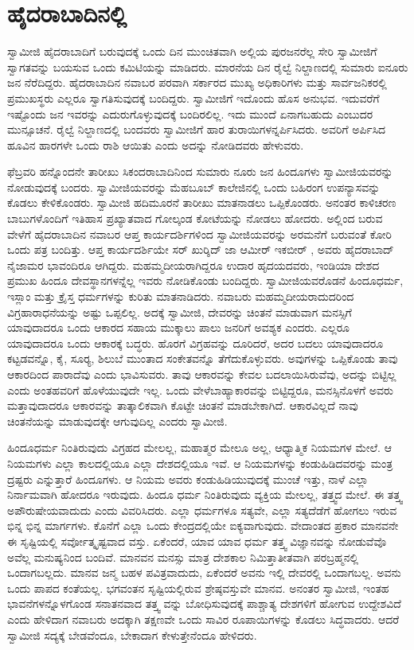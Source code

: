 
\chapter{ಹೈದರಾಬಾದಿನಲ್ಲಿ}

 ಸ್ವಾಮೀಜಿ ಹೈದರಾಬಾದಿಗೆ ಬರುವುದಕ್ಕೆ ಒಂದು ದಿನ ಮುಂಚಿತವಾಗಿ ಅಲ್ಲಿಯ ಪುರಜನರೆಲ್ಲ ಸೇರಿ ಸ್ವಾಮೀಜಿಗೆ ಸ್ವಾಗತವನ್ನು ಬಯಸುವ ಒಂದು ಕಮಿಟಿಯನ್ನು ಮಾಡಿದರು. ಮಾರನೆಯ ದಿನ ರೈಲ್ವೆ ನಿಲ್ದಾಣದಲ್ಲಿ ಸುಮಾರು ಐನೂರು ಜನ ನೆರೆದಿದ್ದರು. ಹೈದರಾಬಾದಿನ ನವಾಬರ ಪರವಾಗಿ ಸರ್ಕಾರದ ಮುಖ್ಯ ಅಧಿಕಾರಿಗಳು ಮತ್ತು ಸಾರ್ವಜನಿಕರಲ್ಲಿ ಪ್ರಮುಖಸ್ಥರು ಎಲ್ಲರೂ ಸ್ವಾಗತಿಸುವುದಕ್ಕೆ ಬಂದಿದ್ದರು. ಸ್ವಾಮೀಜಿಗೆ ಇದೊಂದು ಹೊಸ ಅನುಭವ. ಇದುವರೆಗೆ ಇಷ್ಟೊಂದು ಜನ ಇವರನ್ನು ಎದುರುಗೊಳ್ಳುವುದಕ್ಕೆ ಬಂದಿರಲಿಲ್ಲ. ಇದು ಮುಂದೆ ಏನಾಗಬಹುದು ಎಂಬುದರ ಮುನ್ಸೂಚನೆ. ರೈಲ್ವೆ ನಿಲ್ದಾಣದಲ್ಲಿ ಬಂದವರು ಸ್ವಾಮೀಜಿಗೆ ಹಾರ ತುರಾಯಿಗಳನ್ನರ್ಪಿಸಿದರು. ಅವರಿಗೆ ಅರ್ಪಿಸಿದ ಹೂವಿನ ಹಾರಗಳೇ ಒಂದು ರಾಶಿ ಆಯಿತು ಎಂದು ಅದನ್ನು ನೋಡಿದವರು ಹೇಳುವರು. 

 ಫೆಬ್ರವರಿ ಹನ್ನೊಂದನೇ ತಾರೀಖು ಸಿಕಂದರಾಬಾದಿನಿಂದ ಸುಮಾರು ನೂರು ಜನ ಹಿಂದೂಗಳು ಸ್ವಾಮೀಜಿಯವರನ್ನು ನೋಡುವುದಕ್ಕೆ ಬಂದರು. ಸ್ವಾಮೀಜಿಯವರನ್ನು ಮೆಹಬೂಬ್ ಕಾಲೇಜಿನಲ್ಲಿ ಒಂದು ಬಹಿರಂಗ ಉಪನ್ಯಾಸವನ್ನು ಕೊಡಲು ಕೇಳಿಕೊಂಡರು. ಸ್ವಾಮೀಜಿ ಹದಿಮೂರನೆ ತಾರೀಖು ಮಾತನಾಡಲು ಒಪ್ಪಿಕೊಂಡರು. ಅನಂತರ ಕಾಳಿಚರಣ ಬಾಬುಗಳೊಂದಿಗೆ ಇತಿಹಾಸ ಪ್ರಖ್ಯಾತವಾದ ಗೋಲ್ಕಂಡ ಕೋಟೆಯನ್ನು ನೋಡಲು ಹೋದರು. ಅಲ್ಲಿಂದ ಬರುವ ವೇಳೆಗೆ ಹೈದರಾಬಾದಿನ ನವಾಬರ ಆಪ್ತ ಕಾರ್ಯದರ್ಶಿಗಳಿಂದ ಸ್ವಾಮೀಜಿಯವರನ್ನು ಅರಮನೆಗೆ ಬರುವಂತೆ ಕೋರಿ ಒಂದು ಪತ್ರ ಬಂದಿತ್ತು. ಆಪ್ತ ಕಾರ್ಯದರ್ಶಿಯೇ ಸರ್ ಖುರ್‍ಶಿದ್ ಜಾ ಆಮೀರ್ ಇಕಬೀರ್ , ಅವರು ಹೈದರಾಬಾದ್ ನೈಜಾಮರ ಭಾವಂದಿರೂ ಆಗಿದ್ದರು. ಮಹಮ್ಮದೀಯರಾಗಿದ್ದರೂ ಉದಾರ ಹೃದಯದವರು, ಇಂಡಿಯಾ ದೇಶದ ಪ್ರಮುಖ ಹಿಂದೂ ದೇವಸ್ಥಾನಗಳನ್ನೆಲ್ಲ ಇವರು ನೋಡಿಕೊಂಡು ಬಂದಿದ್ದರು. ಸ್ವಾಮೀಜಿಯವರೊಡನೆ ಹಿಂದೂಧರ್ಮ, ಇಸ್ಲಾಂ ಮತ್ತು ಕ್ರೈಸ್ತ ಧರ್ಮಗಳನ್ನು ಕುರಿತು ಮಾತನಾಡಿದರು. ನವಾಬರು ಮಹಮ್ಮದೀಯರಾದುದರಿಂದ ವಿಗ್ರಹಾರಾಧನೆಯನ್ನು ಅಷ್ಟು ಒಪ್ಪಲಿಲ್ಲ. ಅದಕ್ಕೆ ಸ್ವಾಮೀಜಿ, ದೇವರನ್ನು ಚಿಂತನೆ ಮಾಡುವಾಗ ಮನಸ್ಸಿಗೆ ಯಾವುದಾದರೂ ಒಂದು ಆಕಾರದ ಸಹಾಯ ಮುಕ್ಕಾಲು ಪಾಲು ಜನರಿಗೆ ಅವಶ್ಯಕ ಎಂದರು. ಎಲ್ಲರೂ ಯಾವುದಾದರೂ ಒಂದು ಆಕಾರಕ್ಕೆ ಬದ್ಧರು. ಹೊರಗೆ ವಿಗ್ರಹವನ್ನು ದೂರಿದರೆ, ಅದರ ಬದಲು ಯಾವುದಾದರೂ ಕಟ್ಟಡವನ್ನೊ, ಕೈ, ಸೂರ‍್ಯ, ಶಿಲುಬೆ ಮುಂತಾದ ಸಂಕೇತವನ್ನೊ ತೆಗೆದುಕೊಳ್ಳುವರು. ಅವುಗಳನ್ನು ಒಪ್ಪಿಕೊಂಡು ತಾವು ಆಕಾರದಿಂದ ಪಾರಾದೆವು ಎಂದು ಭಾವಿಸುವರು. ತಾವು ಆಕಾರವನ್ನು ಕೇವಲ ಬದಲಾಯಿಸಿರುವೆವು, ಅದನ್ನು ಬಿಟ್ಟಿಲ್ಲ ಎಂದು ಅಂತಹವರಿಗೆ ಹೊಳೆಯುವುದೇ ಇಲ್ಲ. ಒಂದು ವೇಳೆ\break ಬಾಹ್ಯಾಕಾರವನ್ನು ಬಿಟ್ಟಿದ್ದರೂ, ಮನಸ್ಸಿನೊಳಗೆ ಅವರು ಮತ್ತಾವುದಾದರೂ ಆಕಾರವನ್ನು ತಾತ್ಕಾಲಿಕವಾಗಿ ಕೊಟ್ಟೇ ಚಿಂತನೆ ಮಾಡಬೇಕಾಗಿದೆ. ಆಕಾರವಿಲ್ಲದೆ ನಾವು ಚಿಂತನೆಯನ್ನು ಮಾಡುವುದಕ್ಕೇ ಆಗುವುದಿಲ್ಲ ಎಂದರು ಸ್ವಾಮೀಜಿ.

 ಹಿಂದೂಧರ್ಮ ನಿಂತಿರುವುದು ವಿಗ್ರಹದ ಮೇಲಲ್ಲ, ಮಹಾತ್ಮರ ಮೇಲೂ ಅಲ್ಲ, ಆಧ್ಯಾತ್ಮಿಕ ನಿಯಮಗಳ ಮೇಲೆ. ಆ ನಿಯಮಗಳು ಎಲ್ಲಾ ಕಾಲದಲ್ಲಿಯೂ ಎಲ್ಲಾ ದೇಶದಲ್ಲಿಯೂ ಇವೆ. ಆ ನಿಯಮಗಳನ್ನು ಕಂಡುಹಿಡಿದವರನ್ನು ಮಂತ್ರ ದ್ರಷ್ಟರು ಎನ್ನುತ್ತಾರೆ ಹಿಂದೂಗಳು. ಆ ನಿಯಮ ಅವರು ಕಂಡುಹಿಡಿಯುವುದಕ್ಕೆ ಮುಂಚೆ ಇತ್ತು, ನಾಳೆ ಎಲ್ಲಾ ನಿರ್ನಾಮವಾಗಿ ಹೋದರೂ ಇರುವುದು. ಹಿಂದೂ ಧರ್ಮ ನಿಂತಿರುವುದು ವ್ಯಕ್ತಿಯ ಮೇಲಲ್ಲ, ತತ್ತ್ವದ ಮೇಲೆ. ಈ ತತ್ತ್ವ ಅಪೌರುಷೇಯವಾದುದು ಎಂದು ವಿವರಿಸಿದರು. ಎಲ್ಲಾ ಧರ್ಮಗಳೂ ಸತ್ಯವೇ, ಎಲ್ಲಾ ಸತ್ಯದೆಡೆಗೆ ಹೋಗಲು ಇರುವ ಭಿನ್ನ ಭಿನ್ನ ಮಾರ್ಗಗಳು. ಕೊನೆಗೆ ಎಲ್ಲಾ ಒಂದು ಕೇಂದ್ರದಲ್ಲಿಯೇ ಐಕ್ಯವಾಗುವುದು. ವೇದಾಂತದ ಪ್ರಕಾರ ಮಾನವನೇ ಈ ಸೃಷ್ಟಿಯಲ್ಲಿ ಸರ್ವೋತ್ಕೃಷ್ಟವಾದ ವಸ್ತು. ಏಕೆಂದರೆ, ಯಾವ ಯಾವ ಧರ್ಮ ತತ್ತ್ವ ವಿಜ್ಞಾನವನ್ನು ನೋಡುವೆವೊ ಅವೆಲ್ಲ ಮನುಷ್ಯನಿಂದ ಬಂದಿವೆ. ಮಾನವನ ಮನಸ್ಸು ಮಾತ್ರ ದೇಶಕಾಲ ನಿಮಿತ್ತಾತೀತವಾಗಿ ಪರಬ್ರಹ್ಮನಲ್ಲಿ ಒಂದಾಗಬಲ್ಲದು. ಮಾನವ ಜನ್ಮ ಬಹಳ ಪವಿತ್ರವಾದುದು, ಏಕೆಂದರೆ ಅವನು ಇಲ್ಲಿ ದೇವರಲ್ಲಿ ಒಂದಾಗಬಲ್ಲ. ಅವನು ಒಂದು ಪಾಪದ ಕಂತೆಯಲ್ಲ. ಭಗವಂತನ ಸೃಷ್ಟಿಯಲ್ಲಿರುವ ಶ್ರೇಷ್ಠವಸ್ತುವೇ ಮಾನವ. ಅನಂತರ ಸ್ವಾಮೀಜಿ, ಇಂತಹ ಭಾವನೆಗಳನ್ನೊಳಗೊಂಡ ಸನಾತನವಾದ ತತ್ತ್ವ ವನ್ನು ಬೋಧಿಸುವುದಕ್ಕೆ ಪಾಶ್ಚಾತ್ಯ ದೇಶಗಳಿಗೆ ಹೋಗುವ ಉದ್ದೇಶವಿದೆ ಎಂದು ಹೇಳಿದಾಗ ನವಾಬರು ಅದಕ್ಕಾಗಿ ತಕ್ಷಣವೇ ಒಂದು ಸಾವಿರ ರೂಪಾಯಿಗಳನ್ನು ಕೊಡಲು ಸಿದ್ಧವಾದರು. ಆದರೆ ಸ್ವಾಮೀಜಿ ಸದ್ಯಕ್ಕೆ ಬೇಡವೆಂದೂ, ಬೇಕಾದಾಗ ಕೇಳುತ್ತೇನೆಂದೂ ಹೇಳಿದರು.

